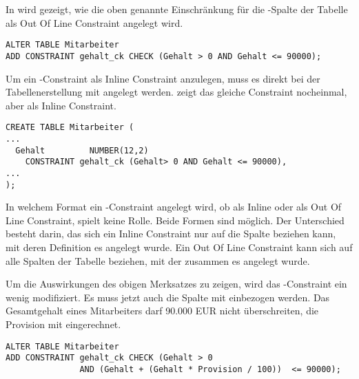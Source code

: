        In  wird gezeigt, wie die oben genannte
        Einschr\"ankung f\"ur die -Spalte der Tabelle
         als Out Of Line Constraint angelegt wird.
        \begin{lstlisting}[language=oracle_sql,caption={Ein \CHECK-Constraint als Out Of Line Constraint},label=sql09_02]
ALTER TABLE Mitarbeiter
ADD CONSTRAINT gehalt_ck CHECK (Gehalt > 0 AND Gehalt <= 90000);
        \end{lstlisting}
        Um ein \CHECK-Constraint als Inline Constraint anzulegen, muss es direkt bei der Tabellenerstellung mit angelegt werden.  zeigt das gleiche Constraint nocheinmal, aber als Inline Constraint.
        \begin{lstlisting}[language=oracle_sql,caption={Ein \CHECK-Constraint als Inline Constraint},label=sql09_03]
CREATE TABLE Mitarbeiter (
...
  Gehalt         NUMBER(12,2)
    CONSTRAINT gehalt_ck (Gehalt> 0 AND Gehalt <= 90000),
...
);
        \end{lstlisting}
        \begin{merke}
          In welchem Format ein \CHECK-Constraint angelegt wird, ob als Inline oder als Out Of Line Constraint, spielt keine Rolle. Beide Formen sind m\"oglich. Der Unterschied besteht darin, das sich ein Inline Constraint nur auf die Spalte beziehen kann, mit deren Definition es angelegt wurde. Ein Out Of Line Constraint kann sich auf alle Spalten der Tabelle beziehen, mit der zusammen es angelegt wurde.
        \end{merke}
        Um die Auswirkungen des obigen Merksatzes zu zeigen, wird das -Constraint ein wenig modifiziert. Es muss jetzt auch die Spalte  mit einbezogen werden. Das Gesamtgehalt eines Mitarbeiters darf 90.000 EUR nicht \"uberschreiten, die Provision mit eingerechnet.
        \begin{lstlisting}[language=oracle_sql,caption={Ein komplexes \CHECK-Constraint},label=sql09_04]
ALTER TABLE Mitarbeiter
ADD CONSTRAINT gehalt_ck CHECK (Gehalt > 0
               AND (Gehalt + (Gehalt * Provision / 100))  <= 90000);
        \end{lstlisting}

